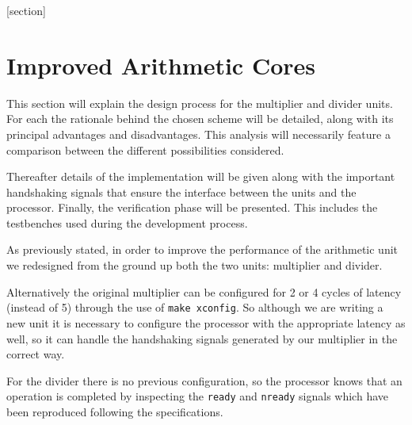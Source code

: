 \newcommand{\ov}[1]{\overline{#1}}
[section]
\newcommand{\unaryminus}{\scalebox{0.5}[1.0]{\( - \)}}
\newcommand{\AND}{\texttt{AND}\xspace}
\newcommand{\RST}{\texttt{RST}\xspace}
\newcommand{\CLK}{\texttt{CLK}\xspace}
\newcommand{\HOLDN}{\texttt{HOLDN}\xspace}
\newcommand{\MULI}{\texttt{MULI}\xspace}
\newcommand{\MULO}{\texttt{MULO}\xspace}
\newcommand{\infer}{\texttt{infer}\xspace}
\newcommand{\multype}{\texttt{multype}\xspace}
\newcommand{\pipe}{\texttt{pipe}\xspace}
\newcommand{\mac}{\texttt{mac}\xspace}
\newcommand{\ready}{\texttt{ready}\xspace}
\newcommand{\start}{\texttt{start}\xspace}
\newcommand{\holdn}{\texttt{holdn}\xspace}
\newcommand{\nready}{\texttt{nready}\xspace}
\newcommand{\STDV}{\texttt{STD\_LOGIC\_VECTOR}\xspace}



\section{Improved Arithmetic Cores}
\label{sec:arth}

This section will explain the design process for the multiplier and divider units.
For each the rationale behind the chosen scheme will be detailed, along with its principal advantages and disadvantages.
This analysis will necessarily feature a comparison between the different possibilities considered.

Thereafter details of the implementation will be given along with the important handshaking signals that ensure the interface between the units and the processor. Finally, the verification phase will be presented. This includes the testbenches used during the development process.

As previously stated, in order to improve the performance of the arithmetic unit we redesigned from the ground up both the
two units: multiplier and divider.

Alternatively the original multiplier can be configured for 2 or 4 cycles of latency (instead of 5) through the use of \texttt{make xconfig}.
So although we are writing a new unit it is necessary to configure the
processor with the appropriate latency as well, so it can handle the
handshaking signals generated by our multiplier in the correct way.

For the divider there is no previous configuration, so the processor knows that an operation is
completed by inspecting the \texttt{ready} and \texttt{nready} signals which have been reproduced following the
specifications.

